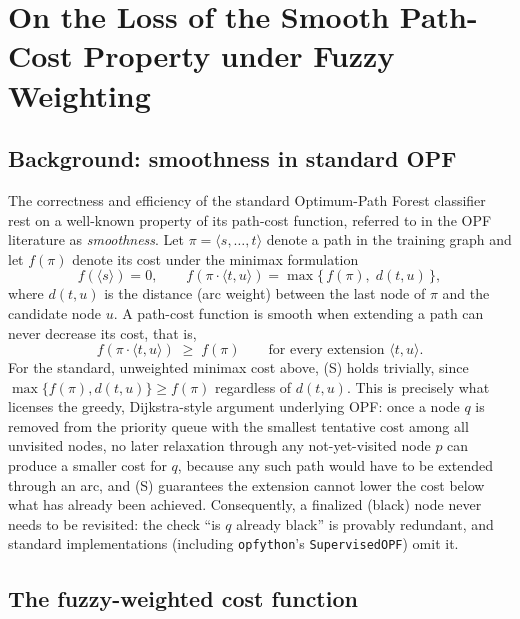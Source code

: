 \section{On the Loss of the Smooth Path-Cost Property under Fuzzy Weighting}
\label{sec:smoothness-proof}

\subsection{Background: smoothness in standard OPF}

The correctness and efficiency of the standard Optimum-Path Forest classifier rest on a well-known property of its path-cost function, referred to in the OPF literature as \emph{smoothness}. Let $\pi = \langle s, \dots, t \rangle$ denote a path in the training graph and let $f(\pi)$ denote its cost under the minimax formulation
\[
f(\langle s \rangle) = 0, \qquad
f(\pi \cdot \langle t, u \rangle) = \max\{\, f(\pi),\; d(t, u) \,\},
\]
where $d(t,u)$ is the distance (arc weight) between the last node of $\pi$ and the candidate node $u$. A path-cost function is smooth when extending a path can never decrease its cost, that is,
\[
f(\pi \cdot \langle t, u \rangle) \;\ge\; f(\pi) \qquad \text{for every extension } \langle t, u \rangle. \tag{S}
\]
For the standard, unweighted minimax cost above, (S) holds trivially, since $\max\{f(\pi), d(t,u)\} \ge f(\pi)$ regardless of $d(t,u)$. This is precisely what licenses the greedy, Dijkstra-style argument underlying OPF: once a node $q$ is removed from the priority queue with the smallest tentative cost among all unvisited nodes, no later relaxation through any not-yet-visited node $p$ can produce a smaller cost for $q$, because any such path would have to be extended through an arc, and (S) guarantees the extension cannot lower the cost below what has already been achieved. Consequently, a finalized (black) node never needs to be revisited: the check ``is $q$ already black'' is provably redundant, and standard implementations (including \texttt{opfython}'s \texttt{SupervisedOPF}) omit it.

\subsection{The fuzzy-weighted cost function}

